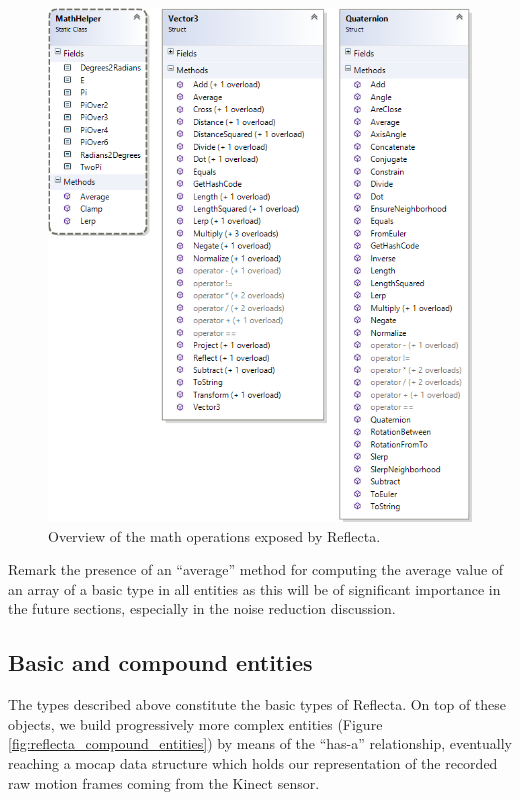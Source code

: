 \documentclass[a4paper, 12pt]{amsart}
\begin{document}
\begin{figure}[htb]
\centering
\includegraphics[width=.9\linewidth]{fig_reflecta_math}
\caption{Overview of the math operations exposed by Reflecta.}
\label{fig:reflecta_math}
\end{figure}

Remark the presence of an ``average'' method for computing the average value of an array of a basic type in all entities as this will be of significant importance in the future sections, especially in the noise reduction discussion.

\subsection{Basic and compound entities}

The types described above constitute the basic types of Reflecta. On top of these objects, we build progressively more complex entities (Figure \ref{fig:reflecta_compound_entities}) by means of the ``has-a'' relationship, eventually reaching a mocap data structure which holds our representation of the recorded raw motion frames coming from the Kinect sensor.
\end{document}
